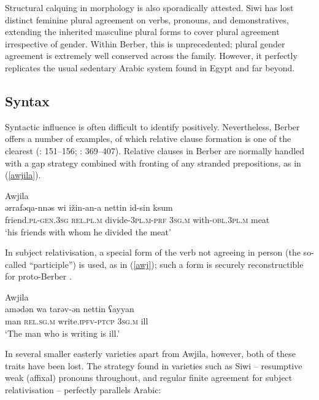 \documentclass[output=paper]{langsci/langscibook}
\begin{document}
Structural calquing in morphology is also sporadically attested. Siwi has lost distinct feminine plural agreement on verbs, pronouns, and demonstratives, extending the inherited masculine plural forms to cover plural agreement irrespective of gender. Within Berber, this is unprecedented; plural gender agreement is extremely well conserved across the family. However, it perfectly replicates the usual sedentary Arabic system found in Egypt and far beyond.


 
 \subsection{Syntax}


Syntactic influence is often difficult to identify positively.  Nevertheless, Berber offers a number of examples, of which relative clause formation is one of the clearest (\citealt{Souag2013book}: 151–156; \citealt{Kossmann2013book}: 369–407). Relative clauses in Berber are normally handled with a gap strategy combined with fronting of any stranded prepositions, as in ‎(\ref{awjila}).

\ea
{Awjila \citep[79]{Paradisi1961}}\\ \label{awjila}
\gll ərrafəqa-nnəs wi ižin-an-a nettin id-sin ksum\\
     friend\textsc{.pl}{}-\textsc{gen.}\textsc{3sg} \textsc{rel.pl.m} divide-\textsc{3pl.m-prf} 3\textsc{sg.m} with-\textsc{obl.}3\textsc{pl}.\textsc{m} meat\\
\glt `his friends with whom he divided the meat'
\z

In subject relativisation, a special form of the verb not agreeing in person (the so-called “participle”) is used, as in (\ref{awj}); such a form is securely reconstructible for proto-Berber \citep{Kossmann2003}. 

\ea \label{awj}
{Awjila \citep[162]{Paradisi1960}}\\
\gll amədən wa tarəv-ən nettin ʕayyan\\
     man \textsc{rel.sg.m} write.\textsc{ipfv-ptcp} \textsc{3sg.m} ill\\
\glt `The man who is writing is ill.'
\z

In several smaller easterly varieties apart from Awjila, however, both of these traits have been lost. The strategy found in varieties such as Siwi – resumptive weak (affixal) pronouns throughout, and regular finite agreement for subject relativisation – perfectly parallels Arabic: 
\end{document}
